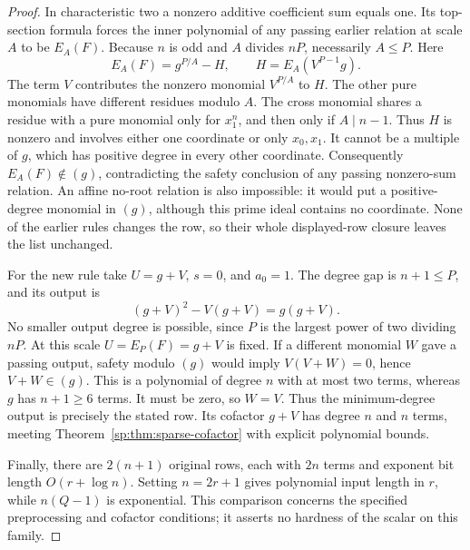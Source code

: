 \begin{proof}
In characteristic two a nonzero additive coefficient sum equals
one. Its top-section formula forces the inner polynomial of any
passing earlier relation at scale $A$ to be $E_A(F)$. Because $n$
is odd and $A$ divides $nP$, necessarily $A\le P$. Here
\[
 E_A(F)=g^{P/A}-H,
 \qquad H=E_A(V^{P-1}g).
\]
The term $V$ contributes the nonzero monomial $V^{P/A}$ to $H$.
The other pure monomials have different residues modulo $A$.
The cross monomial shares a residue with a pure monomial only for
$x_1^n$, and then only if $A\mid n-1$. Thus $H$ is nonzero and
involves either one coordinate or only $x_0,x_1$. It cannot be a
multiple of $g$, which has positive degree in every other coordinate.
Consequently $E_A(F)\notin(g)$, contradicting the safety conclusion
of any passing nonzero-sum relation. An affine no-root relation is
also impossible: it would put a positive-degree monomial in $(g)$,
although this prime ideal contains no coordinate. None of the
earlier rules changes the row, so their whole displayed-row closure
leaves the list unchanged.

For the new rule take $U=g+V$, $s=0$, and $a_0=1$. The degree gap
is $n+1\le P$, and its output is
\[
 (g+V)^2-V(g+V)=g(g+V).
\]
No smaller output degree is possible, since $P$ is the largest
power of two dividing $nP$. At this scale $U=E_P(F)=g+V$ is fixed.
If a different monomial $W$ gave a passing output, safety modulo
$(g)$ would imply $V(V+W)=0$, hence $V+W\in(g)$. This is a
polynomial of degree $n$ with at most two terms, whereas $g$ has
$n+1\ge6$ terms. It must be zero, so $W=V$. Thus the
minimum-degree output is precisely the stated row. Its cofactor
$g+V$ has degree $n$ and $n$ terms, meeting
Theorem~\ref{sp:thm:sparse-cofactor} with explicit polynomial bounds.

Finally, there are $2(n+1)$ original rows, each with $2n$ terms and
exponent bit length $O(r+\log n)$. Setting $n=2r+1$ gives polynomial
input length in $r$, while $n(Q-1)$ is exponential. This comparison
concerns the specified preprocessing and cofactor conditions; it
asserts no hardness of the scalar on this family.
\end{proof}
